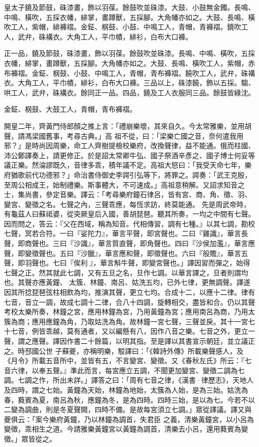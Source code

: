 \begin{pinyinscope}
 皇太子鐃及節鼓，硃漆畫，飾以羽葆。餘鼓吹並硃漆。大鼓、小鼓無金鐲。長鳴、中鳴、橫吹，五採衣幡，緋掌，畫蹲獸，五採腳。大角幡亦如之。大鼓、長鳴、橫吹工人，紫帽，緋褲褶。金鉦、㭎鼓、小鼓、中鳴工人，青帽，青褲褶。鐃吹工人，武弁，硃褠衣。大角工人，平巾幘，緋衫，白布大口褲。



 正一品，鐃及節鼓，硃漆畫，飾以羽葆。餘鼓吹並硃漆。長鳴、中鳴、橫吹，五採衣幡，緋掌，畫蹲獸，五採腳。大角幡亦如之。大鼓、長鳴、橫吹工人，紫帽，赤布褲褶。金鉦、㭎鼓、小鼓、中鳴工人，青帽，青布褲褶。饒吹工人，武弁，硃褠衣。大角工人，平巾幘，緋衫，白布大口褲。三品以上，硃漆饒，飾以五採。騶、哄工人，武弁，硃褠衣。餘同正一品。四品，鐃及工人衣服同三品。餘鼓皆綠沈。



 金鉦、㭎鼓、大鼓工人，青帽，青布褲褶。



 開皇二年，齊黃門侍郎顏之推上言：「禮崩樂壞，其來自久。今太常雅樂，並用胡聲，請馮梁國舊事，考尋古典。」高
 祖不從，曰：「梁樂亡國之音，奈何遣我用邪？」是時尚因周樂，命工人齊樹提檢校樂府，改換聲律，益不能通。俄而柱國、沛公鄭譯奏上，請更修正。於是詔太常卿牛弘、國子祭酒辛彥之、國子博士何妥等議正樂。然淪謬既久，音律多乖，積年議不定。高祖大怒曰：「我受天命七年，樂府猶歌前代功德邪？」命治書侍御史李諤引弘等下，將罪之。諤奏：「武王克殷，至周公相成王，始制禮樂。斯事體大，不可速成。」高祖意稍解。又詔求知音之士，集尚書，參定音樂。譯云：「考尋樂府鐘石律呂，皆有宮、商、角、徵、羽、變宮、變徵之名。七聲之內，三聲乖應，每恆求訪，終莫能通。
 先是周武帝時，有龜茲人曰蘇祗婆，從突厥皇后入國，善胡琵琶。聽其所奏，一均之中間有七聲。因而問之，答云：『父在西域，稱為知音。代相傳習，調有七種。』以其七調，勘校七聲，冥若合符。一曰『娑陀力』，華言平聲，即宮聲也。二曰『雞識』，華言長聲，即商聲也。三曰『沙識』，華言質直聲，即角聲也。四曰『沙侯加濫』，華言應聲，即變徵聲也。五曰『沙臘』，華言應和聲，即徵聲也。六曰『般贍』，華言五聲，即羽聲也。七曰『俟利』，華言斛牛聲，即變宮聲也。」譯因習而彈之，始得七聲之正。然其就此七調，又有五旦之名，旦作七調。以華言譯之，旦者則謂均也。其聲亦應黃鐘、
 太簇、林鐘、南呂、姑洗五均，已外七律，更無調聲。譯遂因其所捻琵琶弦柱相飲為均，推演其聲，更立七均。合成十二，以應十二律。律有七音，音立一調，故成七調十二律，合八十四調，旋轉相交，盡皆和合。仍以其聲考校太樂所奏，林鐘之宮，應用林鐘為宮，乃用黃鐘為宮；應用南呂為商，乃用太簇為商；應用應鐘為角，乃取姑洗為角。故林鐘一宮七聲，三聲並戾。其十一宮七十七音，例皆乖越，莫有通者，又以編懸有八，因作八音之樂。七音之外，更立一聲，謂之應聲。譯因作書二十餘篇，以明其指。至是譯以其書宣示朝廷，並立議正之。時邳國公世
 子蘇夔，亦稱明樂，駁譯曰：「《韓詩外傳》所載樂聲感人，及《月令》所載五音所中，並皆有五，不言變宮、變徵。又《春秋左氏》所云：『七音六律，以奉五聲。』準此而言，每宮應立五調，不聞更加變宮、變徵二調為七調。七調之作，所出未詳。」譯答之曰：「周有七音之律，《漢書·律歷志》，天地人及四時，謂之七始。黃鐘為天始，林鐘為地始，太簇為人始，是為三始。姑洗為春，蕤賓為夏，南呂為秋，應鐘為冬，是為四時。四時三始，是以為七。今若不以二變為調曲，則是冬夏聲闕，四時不備。是故每宮須立七調。」眾從譯議。譯又與夔俱云：「案今樂府黃鐘，乃以林鐘為調首，失君臣
 之義，清樂黃鐘宮，以小呂為變徵，乖相生之道。今請雅樂黃鐘宮以黃鐘為調首，清樂去小呂，還用蕤賓為變徵。」眾皆從之。




\end{pinyinscope}
